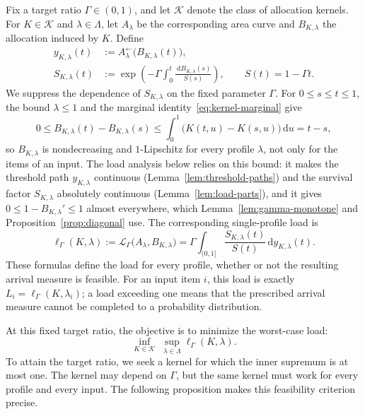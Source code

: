 \documentclass[11pt]{article}
\theoremstyle{definition}
\theoremstyle{remark}
\newcommand{\dd}{\,\mathrm d}
\begin{document}
Fix a target ratio $\Gamma\in(0,1)$, and let $\mathcal K$ denote the class of allocation kernels.
For $K\in\mathcal K$ and $\lambda\in\Lambda$, let $A_\lambda$ be the corresponding area curve and $B_{K,\lambda}$ the allocation induced by $K$.
Define
\begin{equation}\label{eq:scalar-paths}
\begin{aligned}
 y_{K,\lambda}(t)&:=A_\lambda^{\leftarrow}\bigl(B_{K,\lambda}(t)\bigr),\\
 S_{K,\lambda}(t)&:=\exp\!\left(-\Gamma\int_0^t
                       \frac{\dd B_{K,\lambda}(s)}{S(s)}\right),
 \qquad S(t)=1-\Gamma t.
\end{aligned}
\end{equation}
We suppress the dependence of $S_{K,\lambda}$ on the fixed parameter $\Gamma$.
For $0\le s\le t\le1$, the bound $\lambda\le1$ and the marginal identity~\eqref{eq:kernel-marginal} give
\[
 0\le B_{K,\lambda}(t)-B_{K,\lambda}(s)
 \le\int_0^1\bigl(K(t,u)-K(s,u)\bigr)\dd u
 =t-s,
\]
so $B_{K,\lambda}$ is nondecreasing and $1$-Lipschitz for every profile $\lambda$, not only for the items of an input.
The load analysis below relies on this bound: it makes the threshold path $y_{K,\lambda}$ continuous (Lemma~\ref{lem:threshold-paths}) and the survival factor $S_{K,\lambda}$ absolutely continuous (Lemma~\ref{lem:load-parts}), and it gives $0\le1-B_{K,\lambda}'\le1$ almost everywhere, which Lemma~\ref{lem:gamma-monotone} and Proposition~\ref{prop:diagonal} use.
The corresponding single-profile load is
\begin{equation}\label{eq:scalar-load}
 \ell_\Gamma(K,\lambda)
 :=\mathcal L_\Gamma\bigl(A_\lambda,B_{K,\lambda}\bigr)
 =\Gamma\int_{(0,1]}\frac{S_{K,\lambda}(t)}{S(t)}\dd y_{K,\lambda}(t).
\end{equation}
These formulas define the load for every profile, whether or not the resulting arrival measure is feasible.
For an input item $i$, this load is exactly $L_i=\ell_\Gamma(K,\lambda_i)$; a load exceeding one means that the prescribed arrival measure cannot be completed to a probability distribution.

At this fixed target ratio, the objective is to minimize the worst-case load:
\begin{equation}\label{eq:kernel-optimization}
 \inf_{K\in\mathcal K}\;\sup_{\lambda\in\Lambda}\ell_\Gamma(K,\lambda).
\end{equation}
To attain the target ratio, we seek a kernel for which the inner supremum is at most one.
The kernel may depend on $\Gamma$, but the same kernel must work for every profile and every input.
The following proposition makes this feasibility criterion precise.
\end{document}
